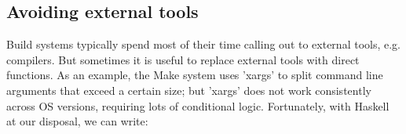 

%
%
%
%

\subsection{Avoiding external tools\label{sec:real_code}}

Build systems typically spend most of their time calling out to external
tools, e.g. compilers. But sometimes it is useful to replace external tools
with direct functions. As an example, the Make system uses \lst'xargs' to
split command line arguments that exceed a certain size; but \lst'xargs' does not work
consistently across OS versions, requiring lots of conditional logic.
Fortunately, with Haskell at our disposal, we can write:

